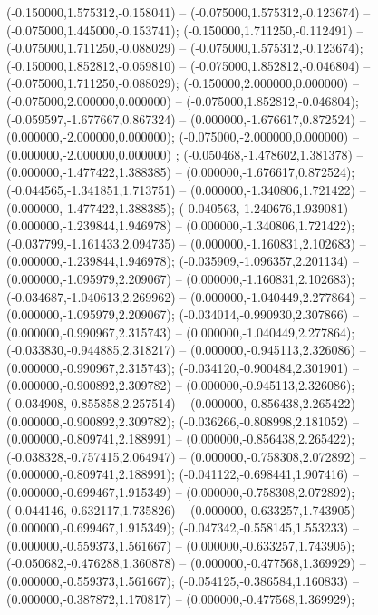  (-0.150000,1.575312,-0.158041) -- (-0.075000,1.575312,-0.123674) -- (-0.075000,1.445000,-0.153741);
 (-0.150000,1.711250,-0.112491) -- (-0.075000,1.711250,-0.088029) -- (-0.075000,1.575312,-0.123674);
 (-0.150000,1.852812,-0.059810) -- (-0.075000,1.852812,-0.046804) -- (-0.075000,1.711250,-0.088029);
 (-0.150000,2.000000,0.000000) -- (-0.075000,2.000000,0.000000) -- (-0.075000,1.852812,-0.046804);
 (-0.059597,-1.677667,0.867324) -- (0.000000,-1.676617,0.872524) -- (0.000000,-2.000000,0.000000);
 (-0.075000,-2.000000,0.000000) -- (0.000000,-2.000000,0.000000) ;
 (-0.050468,-1.478602,1.381378) -- (0.000000,-1.477422,1.388385) -- (0.000000,-1.676617,0.872524);
 (-0.044565,-1.341851,1.713751) -- (0.000000,-1.340806,1.721422) -- (0.000000,-1.477422,1.388385);
 (-0.040563,-1.240676,1.939081) -- (0.000000,-1.239844,1.946978) -- (0.000000,-1.340806,1.721422);
 (-0.037799,-1.161433,2.094735) -- (0.000000,-1.160831,2.102683) -- (0.000000,-1.239844,1.946978);
 (-0.035909,-1.096357,2.201134) -- (0.000000,-1.095979,2.209067) -- (0.000000,-1.160831,2.102683);
 (-0.034687,-1.040613,2.269962) -- (0.000000,-1.040449,2.277864) -- (0.000000,-1.095979,2.209067);
 (-0.034014,-0.990930,2.307866) -- (0.000000,-0.990967,2.315743) -- (0.000000,-1.040449,2.277864);
 (-0.033830,-0.944885,2.318217) -- (0.000000,-0.945113,2.326086) -- (0.000000,-0.990967,2.315743);
 (-0.034120,-0.900484,2.301901) -- (0.000000,-0.900892,2.309782) -- (0.000000,-0.945113,2.326086);
 (-0.034908,-0.855858,2.257514) -- (0.000000,-0.856438,2.265422) -- (0.000000,-0.900892,2.309782);
 (-0.036266,-0.808998,2.181052) -- (0.000000,-0.809741,2.188991) -- (0.000000,-0.856438,2.265422);
 (-0.038328,-0.757415,2.064947) -- (0.000000,-0.758308,2.072892) -- (0.000000,-0.809741,2.188991);
 (-0.041122,-0.698441,1.907416) -- (0.000000,-0.699467,1.915349) -- (0.000000,-0.758308,2.072892);
 (-0.044146,-0.632117,1.735826) -- (0.000000,-0.633257,1.743905) -- (0.000000,-0.699467,1.915349);
 (-0.047342,-0.558145,1.553233) -- (0.000000,-0.559373,1.561667) -- (0.000000,-0.633257,1.743905);
 (-0.050682,-0.476288,1.360878) -- (0.000000,-0.477568,1.369929) -- (0.000000,-0.559373,1.561667);
 (-0.054125,-0.386584,1.160833) -- (0.000000,-0.387872,1.170817) -- (0.000000,-0.477568,1.369929);
